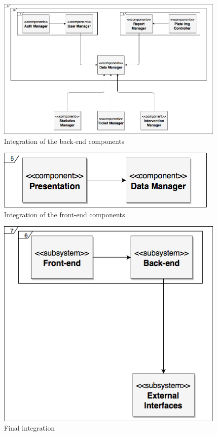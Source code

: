 \documentclass{article}
\begin{document}
	\begin{figure}[H]
			\centering
			\includegraphics[scale=0.35]{Images/Diagrams/IntegrationDiagram1.png}
			\caption{Integration of the back-end components}
	\end{figure}
	\begin{figure}[H]
			\centering
			\includegraphics[scale=0.5]{Images/Diagrams/IntegrationDiagram2.png}
			\caption{Integration of the front-end components}
	\end{figure}
	\begin{figure}[H]
			\centering
			\includegraphics[scale=0.5]{Images/Diagrams/IntegrationDiagram3.png}
			\caption{Final integration}
	\end{figure}
	\pagebreak
		
\end{document}
